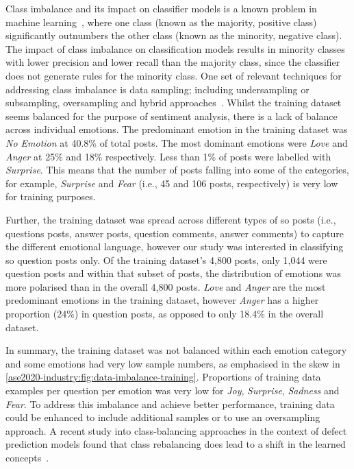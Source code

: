 Class imbalance and its impact on classifier models is a known problem in machine learning~\citep{Lopez2014, Weiss2004}, where  one class (known as the majority, positive class) significantly outnumbers the other class (known as the minority, negative class).  The impact of class imbalance on classification models results in minority classes with lower precision and lower recall than the majority class, since the classifier does not generate rules for the minority class.  One set of relevant techniques for addressing class imbalance is data sampling; including undersampling or subsampling, oversampling and hybrid approaches~\citep{Lopez2014}.
Whilst the training dataset seems balanced for the purpose of sentiment analysis, there is a lack of balance across individual emotions.  The predominant emotion in the training dataset was \textit{No Emotion} at 40.8\% of total posts. The most dominant emotions were \textit{Love} and \textit{Anger} at 25\% and 18\% respectively.  Less than 1\% of posts were labelled with \textit{Surprise}.  This means that the number of posts falling into some of the categories, for example, \textit{Surprise} and \textit{Fear} (i.e., 45 and 106 posts, respectively) is very low for training purposes. 

Further, the training dataset was spread across different types of \gls{so} posts (i.e., questions posts, answer posts, question comments, answer comments) to capture the different emotional language, however our study was interested in classifying \gls{so} question posts only. Of the training dataset's 4,800 posts, only 1,044 were question posts and within that subset of posts, the distribution of emotions was more polarised than in the overall 4,800 posts. \textit{Love} and \textit{Anger} are the most predominant emotions in the training dataset, however \textit{Anger} has a higher proportion (24\%) in question posts, as opposed to only 18.4\% in the overall dataset. 

In summary, the training dataset was not balanced within each emotion category and some emotions had very low sample numbers, as emphasised in the skew in \cref{ase2020-industry:fig:data-imbalance-training}.  Proportions of training data examples per question per emotion was very low for \textit{Joy}, \textit{Surprise}, \textit{Sadness} and \textit{Fear}.
To address this imbalance and achieve better performance, training data could be enhanced to include additional samples or to use an oversampling approach.  A recent study into class-balancing approaches in the context of defect prediction models found that class rebalancing does lead to a shift in the learned concepts~\citep{Turhan2012OnModels}.

